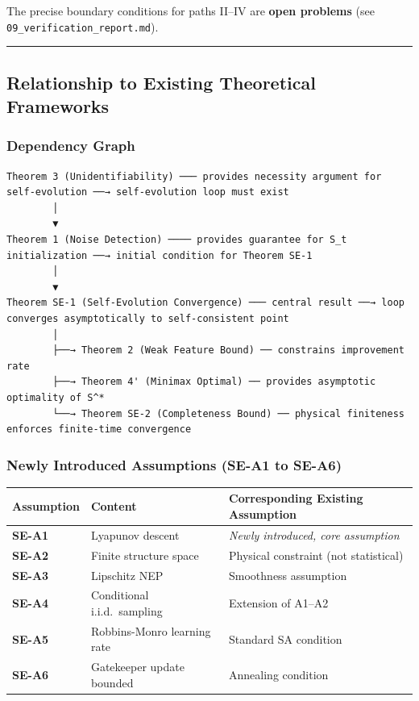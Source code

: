\documentclass[
  12pt,
]{article}
\begin{document}
The precise boundary conditions for paths II--IV are \textbf{open problems} (see
\texttt{09\_verification\_report.md}).

\begin{center}\rule{0.5\linewidth}{0.5pt}\end{center}

\subsection{Relationship to Existing Theoretical Frameworks}\label{relationship-to-existing-theories}

\subsubsection{Dependency Graph}\label{dependency-graph}

\begin{verbatim}
Theorem 3 (Unidentifiability) ─── provides necessity argument for self-evolution ──→ self-evolution loop must exist
        │
        ▼
Theorem 1 (Noise Detection) ──── provides guarantee for S_t initialization ──→ initial condition for Theorem SE-1
        │
        ▼
Theorem SE-1 (Self-Evolution Convergence) ─── central result ──→ loop converges asymptotically to self-consistent point
        │
        ├──→ Theorem 2 (Weak Feature Bound) ── constrains improvement rate
        ├──→ Theorem 4' (Minimax Optimal) ── provides asymptotic optimality of S^*
        └──→ Theorem SE-2 (Completeness Bound) ── physical finiteness enforces finite-time convergence
\end{verbatim}

\subsubsection{Newly Introduced Assumptions (SE-A1 to
SE-A6)}\label{new-assumptions-se-a1-to-se-a6}

\begin{longtable}[]{@{}lll@{}}
\toprule\noalign{}
Assumption & Content & Corresponding Existing Assumption \\
\midrule\noalign{}
\endhead
\bottomrule\noalign{}
\endlastfoot
\textbf{SE-A1} & Lyapunov descent & \emph{Newly introduced, core assumption} \\
\textbf{SE-A2} & Finite structure space & Physical constraint (not statistical) \\
\textbf{SE-A3} & Lipschitz NEP & Smoothness assumption \\
\textbf{SE-A4} & Conditional i.i.d.\ sampling & Extension of A1--A2 \\
\textbf{SE-A5} & Robbins-Monro learning rate & Standard SA condition \\
\textbf{SE-A6} & Gatekeeper update bounded & Annealing condition \\
\end{longtable}
\end{document}
